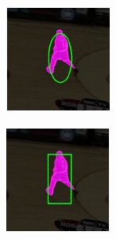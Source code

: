 \begin{figure}[t]
\begin{subfigure}[b]{0.135\textwidth}
        \caption[]{}
    \end{subfigure}
    \hfill
    \begin{subfigure}[b]{0.135\textwidth}
        \centering
        \includegraphics[width=\textwidth]{figures/theoretical_foundations/fast_vot_rot_bbox_algo_03.pdf}
        \caption[]{}
    \end{subfigure}
    \hfill
    \begin{subfigure}[b]{0.135\textwidth}
        \centering
        \includegraphics[width=\textwidth]{figures/theoretical_foundations/fast_vot_rot_bbox_algo_04.pdf}

\end{subfigure}
\end{figure}
